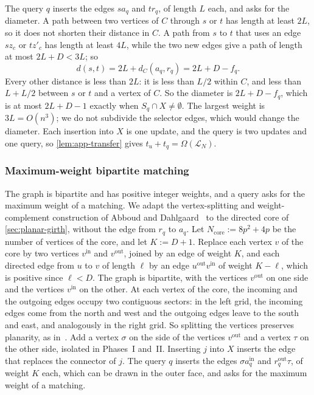 The query $q$ inserts the edges $sa_q$ and $tr_q$, of length $L$ each, and asks for the diameter. A path between two vertices of $C$ through $s$ or $t$ has length at least $2L$, so it does not shorten their distance in $C$. A path from $s$ to $t$ that uses an edge $sz_c$ or $tz'_c$ has length at least $4L$, while the two new edges give a path of length at most $2L+D<3L$; so
\[
 d(s,t)=2L+d_C(a_q,r_q)=2L+D-f_q.
\]
Every other distance is less than $2L$: it is less than $L/2$ within $C$, and less than $L+L/2$ between $s$ or $t$ and a vertex of $C$. So the diameter is $2L+D-f_q$, which is at most $2L+D-1$ exactly when $S_q\cap X\ne\emptyset$. The largest weight is $3L=O(n^3)$; we do not subdivide the selector edges, which would change the diameter. Each insertion into $X$ is one update, and the query is two updates and one query, so \cref{lem:app-transfer} gives $t_u+t_q=\Omega(\mathcal L_N)$.

\subsubsection{Maximum-weight bipartite matching}\label{sec:planar-matching}

The graph is bipartite and has positive integer weights, and a query asks for the maximum weight of a matching. We adapt the vertex-splitting and weight-complement construction of Abboud and Dahlgaard~\cite[Section~4]{abboud_popular_2016} to the directed core of \cref{sec:planar-girth}, without the edge from $r_q$ to $a_q$. Let $N_{\mathrm{core}}:=8p^2+4p$ be the number of vertices of the core, and let $K:=D+1$. Replace each vertex $v$ of the core by two vertices $v^{\mathrm{in}}$ and $v^{\mathrm{out}}$, joined by an edge of weight $K$, and each directed edge from $u$ to $v$ of length $\ell$ by an edge $u^{\mathrm{out}}v^{\mathrm{in}}$ of weight $K-\ell$, which is positive since $\ell<D$. The graph is bipartite, with the vertices $v^{\mathrm{out}}$ on one side and the vertices $v^{\mathrm{in}}$ on the other. At each vertex of the core, the incoming and the outgoing edges occupy two contiguous sectors: in the left grid, the incoming edges come from the north and west and the outgoing edges leave to the south and east, and analogously in the right grid. So splitting the vertices preserves planarity, as in~\cite{abboud_popular_2016}. Add a vertex $\sigma$ on the side of the vertices $v^{\mathrm{out}}$ and a vertex $\tau$ on the other side, isolated in Phases~I and~II. Inserting $j$ into $X$ inserts the edge that replaces the connector of $j$. The query $q$ inserts the edges $\sigma a_q^{\mathrm{in}}$ and $r_q^{\mathrm{out}}\tau$, of weight $K$ each, which can be drawn in the outer face, and asks for the maximum weight of a matching.

